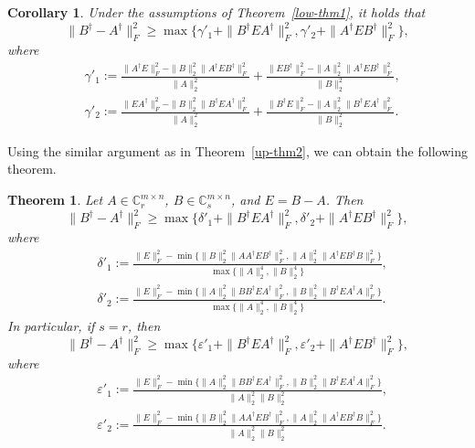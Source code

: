 \documentclass[11pt]{article}
\newtheorem{theorem}{Theorem}[section]
\newtheorem{corollary}{Corollary}[section]
\begin{document}
\begin{corollary}
Under the assumptions of Theorem~\ref{low-thm1}, it holds that
\begin{equation}\label{corlow1.2}
\|B^{\dagger}-A^{\dagger}\|_{F}^{2}\geq\max\big\{\gamma'_{1}+\|B^{\dagger}EA^{\dagger}\|_{F}^{2},\gamma'_{2}+\|A^{\dagger}EB^{\dagger}\|_{F}^{2}\big\},
\end{equation}
where
\begin{align*}
&\gamma'_{1}:=\frac{\|A^{\dagger}E\|_{F}^{2}-\|B\|_{2}^{2}\|A^{\dagger}EB^{\dagger}\|_{F}^{2}}{\|A\|_{2}^{2}}+\frac{\|EB^{\dagger}\|_{F}^{2}-\|A\|_{2}^{2}\|A^{\dagger}EB^{\dagger}\|_{F}^{2}}{\|B\|_{2}^{2}},\\
&\gamma'_{2}:=\frac{\|EA^{\dagger}\|_{F}^{2}-\|B\|_{2}^{2}\|B^{\dagger}EA^{\dagger}\|_{F}^{2}}{\|A\|_{2}^{2}}+\frac{\|B^{\dagger}E\|_{F}^{2}-\|A\|_{2}^{2}\|B^{\dagger}EA^{\dagger}\|_{F}^{2}}{\|B\|_{2}^{2}}.
\end{align*}
\end{corollary}

Using the similar argument as in Theorem~\ref{up-thm2}, we can obtain the following theorem.

\begin{theorem}\label{low-thm2}
Let $A\in\mathbb{C}^{m\times n}_{r}$, $B\in\mathbb{C}^{m\times n}_{s}$, and $E=B-A$. Then
\begin{equation}\label{low2.1}
\|B^{\dagger}-A^{\dagger}\|_{F}^{2}\geq\max\big\{\delta'_{1}+\|B^{\dagger}EA^{\dagger}\|_{F}^{2},\delta'_{2}+\|A^{\dagger}EB^{\dagger}\|_{F}^{2}\big\},
\end{equation}
where
\begin{align*}
&\delta'_{1}:=\frac{\|E\|_{F}^{2}-\min\big\{\|B\|_{2}^{2}\|AA^{\dagger}EB^{\dagger}\|_{F}^{2},\|A\|_{2}^{2}\|A^{\dagger}EB^{\dagger}B\|_{F}^{2}\big\}}{\max\big\{\|A\|_{2}^{4},\|B\|_{2}^{4}\big\}},\\ &\delta'_{2}:=\frac{\|E\|_{F}^{2}-\min\big\{\|A\|_{2}^{2}\|BB^{\dagger}EA^{\dagger}\|_{F}^{2},\|B\|_{2}^{2}\|B^{\dagger}EA^{\dagger}A\|_{F}^{2}\big\}}{\max\big\{\|A\|_{2}^{4},\|B\|_{2}^{4}\big\}}.
\end{align*}
In particular, if $s=r$, then
\begin{equation}\label{low2.2}
\|B^{\dagger}-A^{\dagger}\|_{F}^{2}\geq\max\big\{\varepsilon'_{1}+\|B^{\dagger}EA^{\dagger}\|_{F}^{2},\varepsilon'_{2}+\|A^{\dagger}EB^{\dagger}\|_{F}^{2}\big\},
\end{equation}
where
\begin{align*}
&\varepsilon'_{1}:=\frac{\|E\|_{F}^{2}-\min\big\{\|A\|_{2}^{2}\|BB^{\dagger}EA^{\dagger}\|_{F}^{2},\|B\|_{2}^{2}\|B^{\dagger}EA^{\dagger}A\|_{F}^{2}\big\}}{\|A\|_{2}^{2}\|B\|_{2}^{2}},\\ &\varepsilon'_{2}:=\frac{\|E\|_{F}^{2}-\min\big\{\|B\|_{2}^{2}\|AA^{\dagger}EB^{\dagger}\|_{F}^{2},\|A\|_{2}^{2}\|A^{\dagger}EB^{\dagger}B\|_{F}^{2}\big\}}{\|A\|_{2}^{2}\|B\|_{2}^{2}}.
\end{align*}
\end{theorem}
\end{document}
